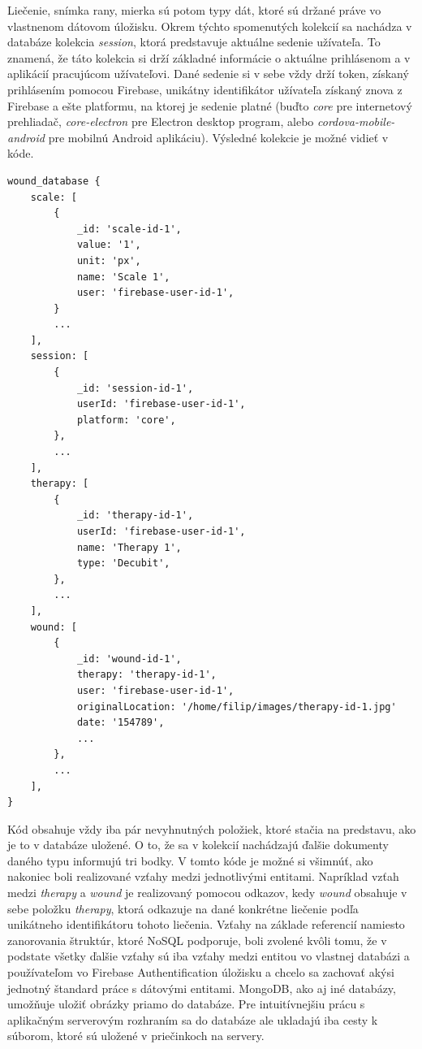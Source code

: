 Liečenie, snímka rany, mierka sú potom typy dát, ktoré sú držané práve vo vlastnenom dátovom úložisku. Okrem týchto spomenutých kolekcií sa nachádza v databáze kolekcia  \textit{session}, ktorá predstavuje aktuálne sedenie užívateľa. To znamená, že táto kolekcia si drží základné informácie o aktuálne prihlásenom a v aplikácií pracujúcom užívateľovi. Dané sedenie si v sebe vždy drží token, získaný prihlásením pomocou Firebase, unikátny identifikátor užívateľa získaný znova z Firebase a ešte platformu, na ktorej je sedenie platné (buďto  \textit{core} pre internetový prehliadač,  \textit{core-electron} pre Electron desktop program, alebo  \textit{cordova-mobile-android} pre mobilnú Android aplikáciu). Výsledné kolekcie je možné vidieť v kóde.
\begin{lstlisting}[caption={Finálna štruktúra databáze},captionpos=b]
wound_database {
    scale: [
        {
            _id: 'scale-id-1',
            value: '1',
            unit: 'px',
            name: 'Scale 1',
            user: 'firebase-user-id-1',
        }
        ...
    ],
    session: [
        {
            _id: 'session-id-1',
            userId: 'firebase-user-id-1',
            platform: 'core',
        },
        ...
    ],
    therapy: [
        {
            _id: 'therapy-id-1',
            userId: 'firebase-user-id-1',
            name: 'Therapy 1',
            type: 'Decubit',
        },
        ...
    ],
    wound: [
        {
            _id: 'wound-id-1',
            therapy: 'therapy-id-1',
            user: 'firebase-user-id-1',
            originalLocation: '/home/filip/images/therapy-id-1.jpg'
            date: '154789',
            ...
        },
        ...
    ],
}
\end{lstlisting}
Kód obsahuje vždy iba pár nevyhnutných položiek, ktoré stačia na predstavu, ako je to v databáze uložené. O to, že sa v kolekcií nachádzajú ďalšie dokumenty daného typu informujú tri bodky. V tomto kóde je možné si všimnúť, ako nakoniec boli realizované vzťahy medzi jednotlivými entitami. Napríklad vzťah medzi  \textit{therapy} a  \textit{wound} je realizovaný pomocou odkazov, kedy  \textit{wound} obsahuje v sebe položku  \textit{therapy}, ktorá odkazuje na dané konkrétne liečenie podľa unikátneho identifikátoru tohoto liečenia. Vzťahy na základe referencií namiesto zanorovania štruktúr, ktoré NoSQL podporuje, boli zvolené kvôli tomu, že v podstate všetky ďalšie vzťahy sú iba vzťahy medzi entitou vo vlastnej databázi a používateľom vo Firebase Authentification úložisku a chcelo sa zachovať akýsi jednotný štandard práce s dátovými entitami.  MongoDB, ako aj iné databázy, umožňuje uložiť obrázky priamo do databáze. Pre intuitívnejšiu prácu s aplikačným serverovým rozhraním sa do databáze ale ukladajú iba cesty k súborom, ktoré sú uložené v priečinkoch na servery.

